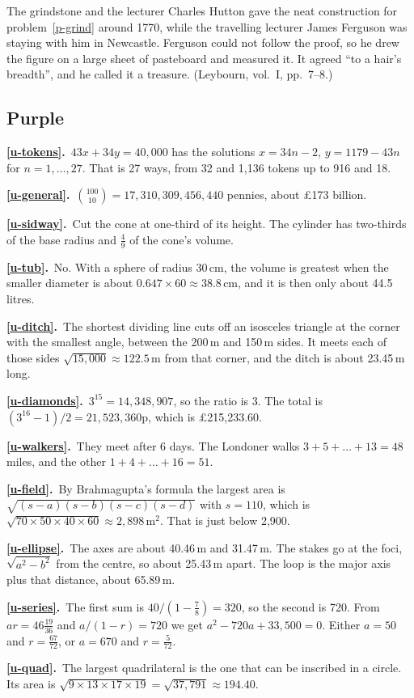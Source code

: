 \documentclass[11pt,a4paper]{article}
\newcounter{prob}
\newcommand{\ans}[2]{\par\smallskip\noindent\textbf{\ref{#1}.}\ #2}
\begin{document}
\begin{diarynote}{The grindstone and the lecturer}
Charles Hutton gave the neat construction for problem~\ref{p-grind} around 1770, while
the travelling lecturer James Ferguson was staying with him in Newcastle. Ferguson could
not follow the proof, so he drew the figure on a large sheet of pasteboard and measured
it. It agreed ``to a hair's breadth'', and he called it a treasure. (Leybourn, vol.~I,
pp.~7--8.)
\end{diarynote}

\subsection*{\color{bandpurple}Purple}
\ans{u-tokens}{$43x + 34y = 40{,}000$ has the solutions $x = 34n-2$, $y = 1179-43n$ for
$n = 1,\dots,27$. That is 27 ways, from 32 and 1,136 tokens up to 916 and 18.}
\ans{u-general}{$\binom{100}{10} = 17{,}310{,}309{,}456{,}440$ pennies, about £173
billion.}
\ans{u-sidway}{Cut the cone at one-third of its height. The cylinder has two-thirds of
the base radius and $\tfrac49$ of the cone's volume.}
\ans{u-tub}{No. With a sphere of radius 30\,cm, the volume is greatest when the smaller
diameter is about $0.647\times60 \approx 38.8$\,cm, and it is then only about 44.5
litres.}
\ans{u-ditch}{The shortest dividing line cuts off an isosceles triangle at the corner
with the smallest angle, between the 200\,m and 150\,m sides. It meets each of those sides
$\sqrt{15{,}000} \approx 122.5$\,m from that corner, and the ditch is about 23.45\,m
long.}
\ans{u-diamonds}{$3^{15} = 14{,}348{,}907$, so the ratio is 3. The total is
$(3^{16}-1)/2 = 21{,}523{,}360$p, which is £215,233.60.}
\ans{u-walkers}{They meet after 6 days. The Londoner walks $3+5+\dots+13 = 48$ miles, and
the other $1+4+\dots+16 = 51$.}
\ans{u-field}{By Brahmagupta's formula the largest area is
$\sqrt{(s-a)(s-b)(s-c)(s-d)}$ with $s = 110$, which is $\sqrt{70\times50\times40\times60}
\approx 2{,}898$\,m$^2$. That is just below 2,900.}
\ans{u-ellipse}{The axes are about 40.46\,m and 31.47\,m. The stakes go at the foci,
$\sqrt{a^2-b^2}$ from the centre, so about 25.43\,m apart. The loop is the major axis plus
that distance, about 65.89\,m.}
\ans{u-series}{The first sum is $40/(1-\tfrac78) = 320$, so the second is 720. From
$ar = 46\tfrac{19}{36}$ and $a/(1-r) = 720$ we get $a^2 - 720a + 33{,}500 = 0$. Either
$a = 50$ and $r = \tfrac{67}{72}$, or $a = 670$ and $r = \tfrac{5}{72}$.}
\ans{u-quad}{The largest quadrilateral is the one that can be inscribed in a circle. Its
area is $\sqrt{9\times13\times17\times19} = \sqrt{37{,}791} \approx 194.40$.}
\end{document}
